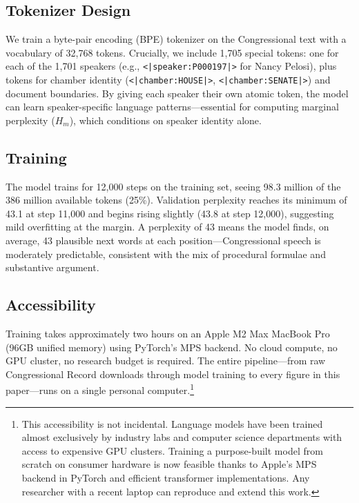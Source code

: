 \documentclass[12pt]{article}
\newcommand{\Hm}{H_m}
\begin{document}
\subsection{Tokenizer Design}

We train a byte-pair encoding (BPE) tokenizer on the Congressional text with a vocabulary of 32,768 tokens. Crucially, we include 1,705 special tokens: one for each of the 1,701 speakers (e.g., \texttt{<|speaker:P000197|>} for Nancy Pelosi), plus tokens for chamber identity (\texttt{<|chamber:HOUSE|>}, \texttt{<|chamber:SENATE|>}) and document boundaries. By giving each speaker their own atomic token, the model can learn speaker-specific language patterns---essential for computing marginal perplexity ($\Hm$), which conditions on speaker identity alone.

\subsection{Training}

The model trains for 12,000 steps on the training set, seeing 98.3 million of the 386 million available tokens (25\%). Validation perplexity reaches its minimum of 43.1 at step 11,000 and begins rising slightly (43.8 at step 12,000), suggesting mild overfitting at the margin. A perplexity of 43 means the model finds, on average, 43 plausible next words at each position---Congressional speech is moderately predictable, consistent with the mix of procedural formulae and substantive argument.

\subsection{Accessibility}

Training takes approximately two hours on an Apple M2 Max MacBook Pro (96GB unified memory) using PyTorch's MPS backend. No cloud compute, no GPU cluster, no research budget is required. The entire pipeline---from raw Congressional Record downloads through model training to every figure in this paper---runs on a single personal computer.\footnote{This accessibility is not incidental. Language models have been trained almost exclusively by industry labs and computer science departments with access to expensive GPU clusters. Training a purpose-built model from scratch on consumer hardware is now feasible thanks to Apple's MPS backend in PyTorch and efficient transformer implementations. Any researcher with a recent laptop can reproduce and extend this work.}
\end{document}
